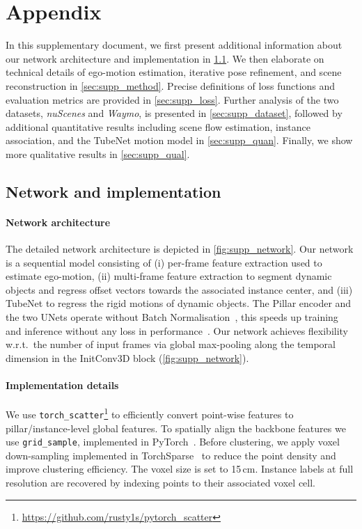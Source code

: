 \section{Appendix}
In this supplementary document, we first present additional information about our network architecture and implementation in \cref{sec:supp_network}. We then elaborate on technical details of ego-motion estimation, iterative pose refinement, and scene reconstruction in \cref{sec:supp_method}. Precise definitions of loss functions and evaluation metrics are provided in \cref{sec:supp_loss}. Further analysis of the two datasets, \emph{nuScenes} and \emph{Waymo}, is presented in \cref{sec:supp_dataset}, followed by additional quantitative results including scene flow estimation, instance association, and the TubeNet motion model in \cref{sec:supp_quan}. Finally, we show more qualitative results in \cref{sec:supp_qual}. 

\subsection{Network and implementation}
\label{sec:supp_network}

\paragraph{Network architecture}
The detailed network architecture is depicted in \cref{fig:supp_network}. Our network is a sequential model consisting of (i) per-frame feature extraction used to estimate ego-motion, (ii) multi-frame feature extraction to segment dynamic objects and regress offset vectors towards the associated instance center, and (iii) TubeNet to regress the rigid motions of dynamic objects. The Pillar encoder and the two UNets operate without Batch Normalisation~\cite{ioffe2015batch}, this speeds up training and inference without any loss in performance~\cite{peng2020convolutional}. Our network achieves flexibility w.r.t.\ the number of input frames via global max-pooling along the temporal dimension in the InitConv3D block (\cref{fig:supp_network}).

\paragraph{Implementation details}
We use \texttt{torch\_scatter}\footnote{\url{https://github.com/rusty1s/pytorch_scatter}} to efficiently convert point-wise features to pillar/instance-level global features. To spatially align the backbone features we use \texttt{grid\_sample}, implemented in PyTorch~\cite{NEURIPS2019_9015}. Before clustering, we apply voxel down-sampling implemented in TorchSparse~\cite{tang2022torchsparse} to reduce the point density and improve clustering efficiency. The voxel size is set to 15$\,$cm. Instance labels at full resolution are recovered by indexing points to their associated voxel cell. 

